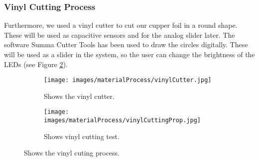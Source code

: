 \documentclass[04.3_buildingProcess.tex]{subfiles}
\begin{document}
    \subsubsection{Vinyl Cutting Process}
    \begin{flushleft}
        \noindent
        Furthermore, we used a vinyl cutter \cite{vinylCutter}  to cut our cupper foil in a 
        round shape. These will be used as capacitive sensors and for the analog slider later. 
        The software Summa Cutter Tools \cite{SoftwareSumma} has been used to draw the circles 
        digitally. These will be used as a slider in the system, so the user can change the 
        brightness of the LEDs (see Figure \ref{fig:vinylCuttingProp}).

        \begin{figure}[H]
            \centering
            \begin{subfigure}{.45\textwidth}
                \centering
                \texttt{[image: images/materialProcess/vinylCutter.jpg]}
                \caption{Shows the vinyl cutter.}
                \label{fig:vinylCutter}
                \vspace{6mm}
            \end{subfigure}
            \medskip
            \hspace{1mm}
            \begin{subfigure}{.45\textwidth}
                \centering
                \texttt{[image: images/materialProcess/vinylCuttingProp.jpg]}
                \caption{Shows vinyl cutting test.}
                \label{fig:vinylCuttingProp}
                \vspace{6mm}
            \end{subfigure}
            \caption{Shows the vinyl cuting process.}
            \label{fig:laserCutTests}
        \end{figure}
    \end{flushleft}
\end{document}
